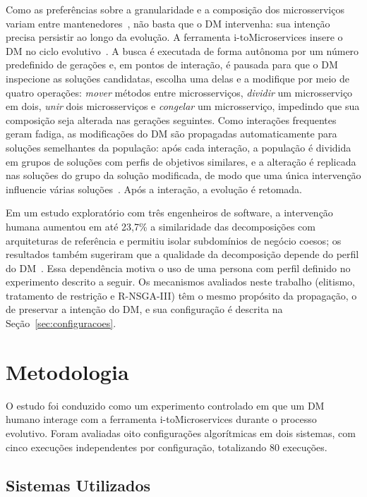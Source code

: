 \documentclass[conference]{IEEEtran}
\newcommand{\itm}{\mbox{i-toMicroservices}}
\begin{document}
Como as preferências sobre a granularidade e a composição dos microsserviços variam entre mantenedores~\cite{assuncao2021,carvalho2024}, não basta que o DM intervenha: sua intenção precisa persistir ao longo da evolução. A ferramenta \itm{} insere o DM no ciclo evolutivo~\cite{castanho2026tool}. A busca é executada de forma autônoma por um número predefinido de gerações e, em pontos de interação, é pausada para que o DM inspecione as soluções candidatas, escolha uma delas e a modifique por meio de quatro operações: \textit{mover} métodos entre microsserviços, \textit{dividir} um microsserviço em dois, \textit{unir} dois microsserviços e \textit{congelar} um microsserviço, impedindo que sua composição seja alterada nas gerações seguintes. Como interações frequentes geram fadiga, as modificações do DM são propagadas automaticamente para soluções semelhantes da população: após cada interação, a população é dividida em grupos de soluções com perfis de objetivos similares, e a alteração é replicada nas soluções do grupo da solução modificada, de modo que uma única intervenção influencie várias soluções~\cite{castanho2026tool,castanho2026hitl}. Após a interação, a evolução é retomada.

Em um estudo exploratório com três engenheiros de software, a intervenção humana aumentou em até 23,7\% a similaridade das decomposições com arquiteturas de referência e permitiu isolar subdomínios de negócio coesos; os resultados também sugeriram que a qualidade da decomposição depende do perfil do DM~\cite{castanho2026hitl}. Essa dependência motiva o uso de uma persona com perfil definido no experimento descrito a seguir. Os mecanismos avaliados neste trabalho (elitismo, tratamento de restrição e R-NSGA-III) têm o mesmo propósito da propagação, o de preservar a intenção do DM, e sua configuração é descrita na Seção~\ref{sec:configuracoes}.

\section{Metodologia}\label{sec:metodologia}

O estudo foi conduzido como um experimento controlado em que um DM humano interage com a ferramenta \itm{} durante o processo evolutivo. Foram avaliadas oito configurações algorítmicas em dois sistemas, com cinco execuções independentes por configuração, totalizando 80 execuções.

\subsection{Sistemas Utilizados}\label{sec:sistemas}
\end{document}
